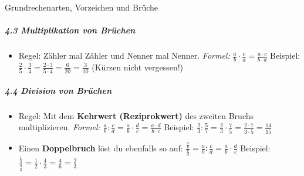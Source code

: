 \begin{erinnerungsboxumgebung}{Grundrechenarten, Vorzeichen und Brüche}
\subparagraph{4.3 Multiplikation von Brüchen}
\begin{itemize}
    \item Regel: Zähler mal Zähler und Nenner mal Nenner.
    \textit{Formel:} $\frac{a}{b} \cdot \frac{c}{d} = \frac{a \cdot c}{b \cdot d}$
    Beispiel: $\frac{2}{5} \cdot \frac{3}{4} = \frac{2 \cdot 3}{5 \cdot 4} = \frac{6}{20} = \frac{3}{10}$ (Kürzen nicht vergessen!)
\end{itemize}

\subparagraph{4.4 Division von Brüchen}
\begin{itemize}
    \item Regel: Mit dem \textbf{Kehrwert (Reziprokwert)} des zweiten Bruchs multiplizieren.
    \textit{Formel:} $\frac{a}{b} : \frac{c}{d} = \frac{a}{b} \cdot \frac{d}{c} = \frac{a \cdot d}{b \cdot c}$
    Beispiel: $\frac{2}{3} : \frac{5}{7} = \frac{2}{3} \cdot \frac{7}{5} = \frac{2 \cdot 7}{3 \cdot 5} = \frac{14}{15}$
    \item Einen \textbf{Doppelbruch} löst du ebenfalls so auf: $\frac{\frac{a}{b}}{\frac{c}{d}} = \frac{a}{b} : \frac{c}{d} = \frac{a}{b} \cdot \frac{d}{c}$
    Beispiel: $\frac{\frac{1}{2}}{\frac{3}{4}} = \frac{1}{2} \cdot \frac{4}{3} = \frac{4}{6} = \frac{2}{3}$
\end{itemize}



\end{erinnerungsboxumgebung}
